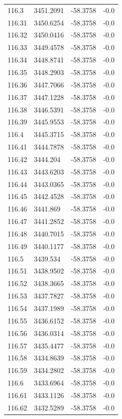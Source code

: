 \begin{table}[H]
\begin{tabular}{llll}
116.3 & 3451.2091 & -58.3758 & -0.0 \\
116.31 & 3450.6254 & -58.3758 & -0.0 \\
116.32 & 3450.0416 & -58.3758 & -0.0 \\
116.33 & 3449.4578 & -58.3758 & -0.0 \\
116.34 & 3448.8741 & -58.3758 & -0.0 \\
116.35 & 3448.2903 & -58.3758 & -0.0 \\
116.36 & 3447.7066 & -58.3758 & -0.0 \\
116.37 & 3447.1228 & -58.3758 & -0.0 \\
116.38 & 3446.5391 & -58.3758 & -0.0 \\
116.39 & 3445.9553 & -58.3758 & -0.0 \\
116.4 & 3445.3715 & -58.3758 & -0.0 \\
116.41 & 3444.7878 & -58.3758 & -0.0 \\
116.42 & 3444.204 & -58.3758 & -0.0 \\
116.43 & 3443.6203 & -58.3758 & -0.0 \\
116.44 & 3443.0365 & -58.3758 & -0.0 \\
116.45 & 3442.4528 & -58.3758 & -0.0 \\
116.46 & 3441.869 & -58.3758 & -0.0 \\
116.47 & 3441.2852 & -58.3758 & -0.0 \\
116.48 & 3440.7015 & -58.3758 & -0.0 \\
116.49 & 3440.1177 & -58.3758 & -0.0 \\
116.5 & 3439.534 & -58.3758 & -0.0 \\
116.51 & 3438.9502 & -58.3758 & -0.0 \\
116.52 & 3438.3665 & -58.3758 & -0.0 \\
116.53 & 3437.7827 & -58.3758 & -0.0 \\
116.54 & 3437.1989 & -58.3758 & -0.0 \\
116.55 & 3436.6152 & -58.3758 & -0.0 \\
116.56 & 3436.0314 & -58.3758 & -0.0 \\
116.57 & 3435.4477 & -58.3758 & -0.0 \\
116.58 & 3434.8639 & -58.3758 & -0.0 \\
116.59 & 3434.2802 & -58.3758 & -0.0 \\
116.6 & 3433.6964 & -58.3758 & -0.0 \\
116.61 & 3433.1126 & -58.3758 & -0.0 \\
116.62 & 3432.5289 & -58.3758 & -0.0 \\

\end{tabular}
\end{table}
